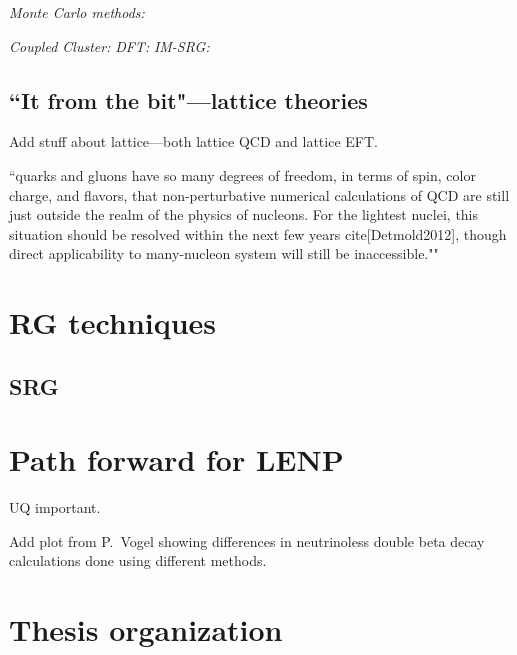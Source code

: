 	\li
	\emph{Monte Carlo methods:}

	\li
	\emph{Coupled Cluster:}
	\li
	\emph{DFT:}
	\li
	\emph{IM-SRG:}
	\ei

	\subsection{``It from the bit"---lattice theories}
	\label{sec:lattice_QCD}

	Add stuff about lattice---both lattice QCD and lattice EFT.

	``quarks and gluons have so many degrees of freedom, in terms of spin,
	color charge, and flavors, that non-perturbative numerical calculations of
	QCD are still just outside the realm of the physics of nucleons. For the
	lightest nuclei, this situation should be resolved within the next few years
	cite[Detmold2012], though direct applicability to many-nucleon system will
	still be inaccessible.""

	\section{RG techniques}

	\subsection{SRG}
	\label{subsec:SRG_intro}



	\section{Path forward for LENP}

	UQ important.

	Add plot from P.\ Vogel showing differences in neutrinoless double beta decay
	calculations done using different methods.

	\section{Thesis organization}

